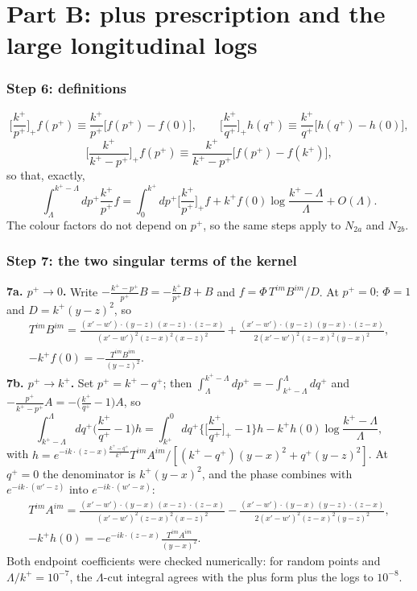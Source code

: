 \documentclass[10pt]{article}
\numberwithin{equation}{section}
\begin{document}
\part*{Part B: plus prescription and the large longitudinal logs}

\section{Step 6: definitions}
\[
\Big[\frac{k^{+}}{p^{+}}\Big]_{+}f(p^{+})\equiv\frac{k^{+}}{p^{+}}\big[f(p^{+})-f(0)\big],\qquad
\Big[\frac{k^{+}}{q^{+}}\Big]_{+}h(q^{+})\equiv\frac{k^{+}}{q^{+}}\big[h(q^{+})-h(0)\big],\]\[
\Big[\frac{k^{+}}{k^{+}-p^{+}}\Big]_{+}f(p^{+})\equiv\frac{k^{+}}{k^{+}-p^{+}}\big[f(p^{+})-f(k^{+})\big],
\]
so that, exactly,
\begin{equation}
\int_{\Lambda}^{k^{+}-\Lambda}dp^{+}\frac{k^{+}}{p^{+}}f=\int_{0}^{k^{+}}dp^{+}\Big[\frac{k^{+}}{p^{+}}\Big]_{+}f+k^{+}f(0)\log\frac{k^{+}-\Lambda}{\Lambda}+O(\Lambda).
\end{equation}
The colour factors do not depend on $p^{+}$, so the same steps apply to $N_{2a}$ and $N_{2b}$.

\section{Step 7: the two singular terms of the kernel}
\textbf{7a. $p^{+}\to0$.} Write $-\frac{k^{+}-p^{+}}{p^{+}}B=-\frac{k^{+}}{p^{+}}B+B$ and $f=\Phi\,T^{im}B^{im}/D$. At $p^{+}=0$: $\Phi=1$ and $D=k^{+}(y-z)^{2}$, so
\begin{gather}
T^{im}B^{im}=\frac{(x'-w')\cdot(y-z)\,(x-z)\cdot(z-x)}{(x'-w')^{2}(z-x)^{2}(x-z)^{2}}+\frac{(x'-w')\cdot(y-z)\,(y-x)\cdot(z-x)}{2(x'-w')^{2}(z-x)^{2}(y-x)^{2}},\\
-k^{+}f(0)=-\frac{T^{im}B^{im}}{(y-z)^{2}}.
\end{gather}
\textbf{7b. $p^{+}\to k^{+}$.} Set $p^{+}=k^{+}-q^{+}$; then $\int_{\Lambda}^{k^{+}-\Lambda}dp^{+}=-\int_{k^{+}-\Lambda}^{\Lambda}dq^{+}$ and $-\frac{p^{+}}{k^{+}-p^{+}}A=-\big(\frac{k^{+}}{q^{+}}-1\big)A$, so
\begin{equation}
\int_{k^{+}-\Lambda}^{\Lambda}dq^{+}\Big(\frac{k^{+}}{q^{+}}-1\Big)h=\int_{k^{+}}^{0}dq^{+}\Big\{\Big[\frac{k^{+}}{q^{+}}\Big]_{+}-1\Big\}h-k^{+}h(0)\log\frac{k^{+}-\Lambda}{\Lambda},
\end{equation}
with $h=e^{-ik\cdot(z-x)\frac{k^{+}-q^{+}}{k^{+}}}T^{im}A^{im}/[(k^{+}-q^{+})(y-x)^{2}+q^{+}(y-z)^{2}]$. At $q^{+}=0$ the denominator is $k^{+}(y-x)^{2}$, and the phase combines with $e^{-ik\cdot(w'-z)}$ into $e^{-ik\cdot(w'-x)}$:
\begin{gather}
T^{im}A^{im}=\frac{(x'-w')\cdot(y-x)\,(x-z)\cdot(z-x)}{(x'-w')^{2}(z-x)^{2}(x-z)^{2}}-\frac{(x'-w')\cdot(y-x)\,(y-z)\cdot(z-x)}{2(x'-w')^{2}(z-x)^{2}(y-z)^{2}},\\ -k^{+}h(0)=-e^{-ik\cdot(z-x)}\frac{T^{im}A^{im}}{(y-x)^{2}}.
\end{gather}
Both endpoint coefficients were checked numerically: for random points and $\Lambda/k^{+}=10^{-7}$, the $\Lambda$-cut integral agrees with the plus form plus the logs to $10^{-8}$.
\end{document}
